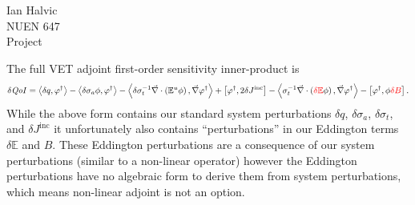 \documentclass{article}
\newcommand{\bra}{\left\langle}
\newcommand{\ket}{\right\rangle}
\newcommand{\sbra}{\left[}
\newcommand{\sket}{\right]}
\renewcommand{\div}{\vec{\nabla} \cdot}
\newcommand{\grad}{\vec{\nabla}}
\newcommand{\vefadj}{\varphi^\dag}
\newcommand{\Edd}{\mathbb{E}}
\newcommand{\BEdd}{B}
\newcommand{\sigt}{\sigma_t}
\newcommand{\siga}{\sigma_a}
\newcommand{\isigt}{\sigma_t^{-1}}
\newcommand{\scalSource}{q}
\newcommand{\qoi}{{\it QoI}\xspace}
\newcommand{\tcr}[1]{\textcolor{red}{#1}}
\begin{document}
\begin{center}
Ian Halvic \\
NUEN 647\\
Project\\
\end{center}

The full VET adjoint first-order sensitivity inner-product is
\begin{equation}
\delta \qoi = \bra \delta \scalSource, \vefadj  \ket - \bra \delta \siga \phi, \vefadj \ket  - \bra \delta \isigt \div \left( \Edd^u \phi \right) , \grad \vefadj \ket + \sbra \vefadj, 2 \delta J^{\text{inc}} \sket - \bra  \isigt \div \left( \tcr{\delta \Edd} \phi \right), \grad \vefadj \ket
- \sbra \vefadj, \phi \tcr{\delta \BEdd} \sket .
\end{equation}
While the above form contains our standard system perturbations $\delta \scalSource$, $\delta \siga$, $\delta \sigt$, and $\delta J^{\text{inc}}$ it unfortunately also contains ``perturbations'' in our Eddington terms $\delta \Edd$ and $ \BEdd$. These Eddington perturbations are a consequence of our system perturbations (similar to a non-linear operator) however the Eddington perturbations have no algebraic form to derive them from system perturbations, which means non-linear adjoint is not an option. 
\end{document}
